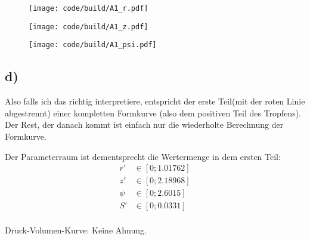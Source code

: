 \begin{figure}
    \centering
    \texttt{[image: code/build/A1\_r.pdf]}
\end{figure}

\begin{figure}
    \centering
    \texttt{[image: code/build/A1\_z.pdf]}
\end{figure}


\begin{figure}
    \centering
    \texttt{[image: code/build/A1\_psi.pdf]}
\end{figure}

\subsection*{d)}
Also falls ich das richtig interpretiere, 
entspricht der erste Teil(mit der roten Linie abgestrennt) einer kompletten Formkurve
(also dem positiven Teil des Tropfens). 
Der Rest, der danach kommt ist einfach nur die wiederholte Berechnung der Formkurve.

Der Parameterraum ist dementsprecht die Wertermenge in dem ersten Teil:
\begin{equation*}
    \begin{aligned}
        r' &\in [0;1.01762]\\
        z' &\in [0;2.18968]\\
        \psi &\in [0;2.6015]\\
        S' &\in [0;0.0331]\\
    \end{aligned}
\end{equation*}
\FloatBarrier

Druck-Volumen-Kurve: Keine Ahnung.

